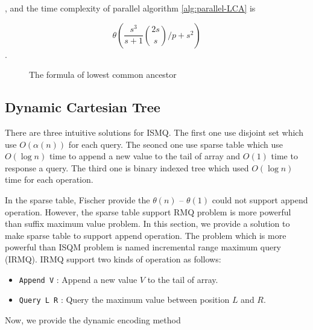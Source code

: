 , and the time complexity of parallel algorithm \ref{alg:parallel-LCA}
is

\begin{equation}
\theta\left(\frac{s^3}{s+1} \binom{2s}{s} \bigg/ p + s^2 \right)
\end{equation}.

\begin{figure*}[!thb]
  
  \caption{The formula of lowest common ancestor}
  \label{fun:LCA}
\end{figure*}



\subsection{Dynamic Cartesian Tree}

There are three intuitive solutions for ISMQ.  The first one use
disjoint set which use $O(\alpha(n))$ for each query.  The seoncd one
use sparse table which use $O(\log n)$ time to append a new value to
the tail of array and $O(1)$ time to response a query.  The third one
is binary indexed tree which used $O(\log n)$ time for each operation.

In the sparse table, Fischer provide the $\theta(n)$ -- $\theta(1)$
could not support append operation.  However, the sparse table support
RMQ problem is more powerful than suffix maximum value problem.  In
this section, we provide a solution to make sparse table to support
append operation.  The problem which is more powerful than ISQM
problem is named incremental range maximum query (IRMQ).  IRMQ support
two kinds of operation as follows:

\begin{itemize}
  \item 
  	\texttt{Append V} : Append a new value $V$ to the tail of array.

  \item
    \texttt{Query L R} : Query the maximum value between position $L$
and $R$. 

\end{itemize}

Now, we provide the dynamic encoding method
